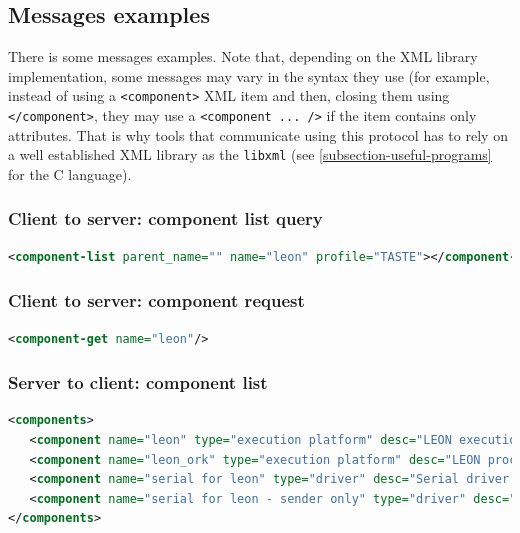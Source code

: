 \documentclass[11pt]{book}
\begin{document}
      \subsection{Messages examples}
      There is some messages examples. Note that, depending on the XML library
      implementation, some messages may vary in the syntax they use (for
      example, instead of using a \texttt{<component>} XML item and then,
      closing them using \texttt{</component>}, they may use a
      \texttt{<component ... />} if the item contains only attributes. That is
      why tools that communicate using this protocol has to rely on a well
      established XML library as the \texttt{libxml} (see 
      \ref{subsection-useful-programs} for the C language).
   
      \subsubsection{Client to server: component list query}
      \begin{lstlisting}[language=xml]
<component-list parent_name="" name="leon" profile="TASTE"></component-list>
      \end{lstlisting}

      \subsubsection{Client to server: component request}
      \begin{lstlisting}[language=xml]
      <component-get name="leon"/>
      \end{lstlisting}


      \subsubsection{Server to client: component list}
      \begin{lstlisting}[language=xml]
<components>
   <component name="leon" type="execution platform" desc="LEON execution platform"/>
   <component name="leon_ork" type="execution platform" desc="LEON processor executing the ORK operating system"/>
   <component name="serial for leon" type="driver" desc="Serial driver for LEON"/>
   <component name="serial for leon - sender only" type="driver" desc="Serial driver for LEON"/>
</components>
      \end{lstlisting}
\end{document}
